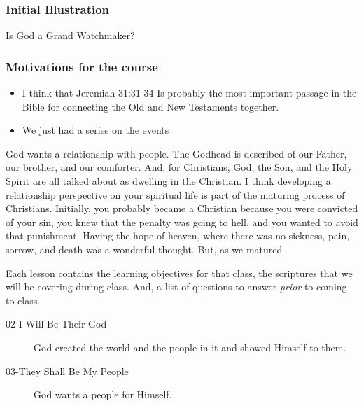 \begin{discussion}


\subsubsection{Initial Illustration}

Is God a Grand Watchmaker?

\subsubsection{Motivations for the course}

\begin{itemize}
\item I think that Jeremiah 31:31-34 Is probably the most important passage in the Bible for connecting the Old and New Testaments together.
\item We just had a series on the events 
\end{itemize}


God wants a relationship with people.  The Godhead is described of our Father, our brother, and our comforter.  And, for Christians, God, the Son, and the Holy Spirit are all talked about as dwelling in the Christian. %
I think developing a relationship perspective on your spiritual life is part of the maturing process of Christians.  Initially, you probably became a Christian because you were convicted of your sin, you knew that the penalty was going to hell, and you wanted to avoid that punishment.  Having the hope of heaven, where there was no sickness, pain, sorrow, and death was a wonderful thought.  But, as we matured 



Each lesson contains the learning objectives for that class, the scriptures that we will be covering during class.  And, a list of questions to answer \emph{prior} to coming to class.

\begin{description}

\item[02-I Will Be Their God] God created the world and the people in it and showed Himself to them.

\item[03-They Shall Be My People] God wants a people for Himself.


\end{description}
\end{discussion}
